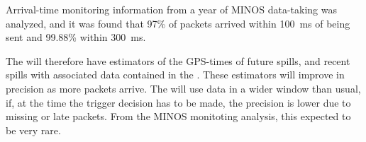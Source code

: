 Arrival-time monitoring information from a year of MINOS data-taking
was analyzed, and it was found that 97\% of packets arrived within
\SI{100}{\ms} of being sent and 99.88\% within \SI{300}{\ms}.

The  will therefore have estimators of the GPS-times of
future spills, and recent spills with associated data contained in the
. These estimators will improve in precision as
more packets arrive.  The  will use data in a wider window than
usual, if, at the time the trigger decision has to be made, the
precision is lower %
due to missing or late packets.  From the
MINOS monitoting analysis, this %
expected to be very rare.

